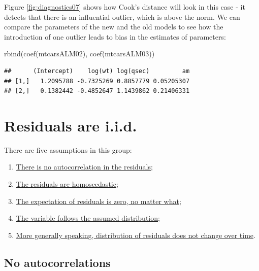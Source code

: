 \documentclass[
]{book}
\newenvironment{Shaded}{\begin{snugshade}}{\end{snugshade}}
\newcommand{\FunctionTok}[1]{\textcolor[rgb]{0.00,0.00,0.00}{#1}}
\newcommand{\NormalTok}[1]{#1}
\providecommand{\tightlist}{%
  \setlength{\itemsep}{0pt}\setlength{\parskip}{0pt}}
\theoremstyle{definition}
\theoremstyle{definition}
\theoremstyle{definition}
\theoremstyle{definition}
\theoremstyle{remark}
\begin{document}
Figure \ref{fig:diagnostics07} shows how Cook's distance will look in this case - it detects that there is an influential outlier, which is above the norm. We can compare the parameters of the new and the old models to see how the introduction of one outlier leads to bias in the estimates of parameters:

\begin{Shaded}
\begin{Highlighting}[]
\FunctionTok{rbind}\NormalTok{(}\FunctionTok{coef}\NormalTok{(mtcarsALM02),}
      \FunctionTok{coef}\NormalTok{(mtcarsALM03))}
\end{Highlighting}
\end{Shaded}

\begin{verbatim}
##      (Intercept)    log(wt) log(qsec)         am
## [1,]   1.2095788 -0.7325269 0.8857779 0.05205307
## [2,]   0.1382442 -0.4852647 1.1439862 0.21406331
\end{verbatim}

\hypertarget{assumptionsResidualsAreIID}{%
\section{Residuals are i.i.d.}\label{assumptionsResidualsAreIID}}

There are five assumptions in this group:

\begin{enumerate}
\def\labelenumi{\arabic{enumi}.}
\tightlist
\item
  \protect\hyperlink{assumptionsResidualsAreIIDAutocorrelations}{There is no autocorrelation in the residuals};
\item
  \protect\hyperlink{assumptionsResidualsAreIIDHomoscedasticity}{The residuals are homoscedastic};
\item
  \protect\hyperlink{assumptionsResidualsAreIIDMean}{The expectation of residuals is zero, no matter what};
\item
  \protect\hyperlink{assumptionsDistribution}{The variable follows the assumed distribution};
\item
  \protect\hyperlink{assumptionsDistributionFixed}{More generally speaking, distribution of residuals does not change over time}.
\end{enumerate}

\hypertarget{assumptionsResidualsAreIIDAutocorrelations}{%
\subsection{No autocorrelations}\label{assumptionsResidualsAreIIDAutocorrelations}}
\end{document}
